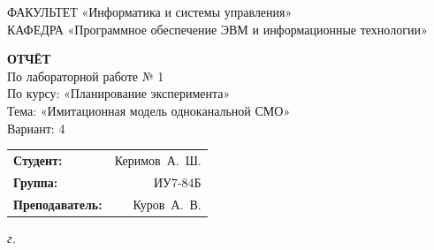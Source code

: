 \begin{titlepage}
	{\doublespacing\small\raggedright
		ФАКУЛЬТЕТ \hspace{28mm} «Информатика и системы управления» \\
		КАФЕДРА \hspace{9mm} «Программное обеспечение ЭВМ и информационные технологии» \\
	}

	\vspace{30mm}

	\textbf{ОТЧЁТ} \\
	По лабораторной работе № 1 \\
	По курсу: «Планирование эксперимента» \\
	Тема: «Имитационная модель одноканальной СМО» \\
	Вариант: 4

	\vspace{40mm}

	\begin{flushleft}
		\begin{tabular}{lr}
			\textbf{Студент:}        & Керимов~А.~Ш. \\
			\textbf{Группа:}         & ИУ7-84Б       \\
			\textbf{Преподаватель:}  & Куров~А.~В.   \\
		\end{tabular}
	\end{flushleft}

	\vfill

	\textit{{\the\year} г.}
\end{titlepage}

\setcounter{page}{2}
